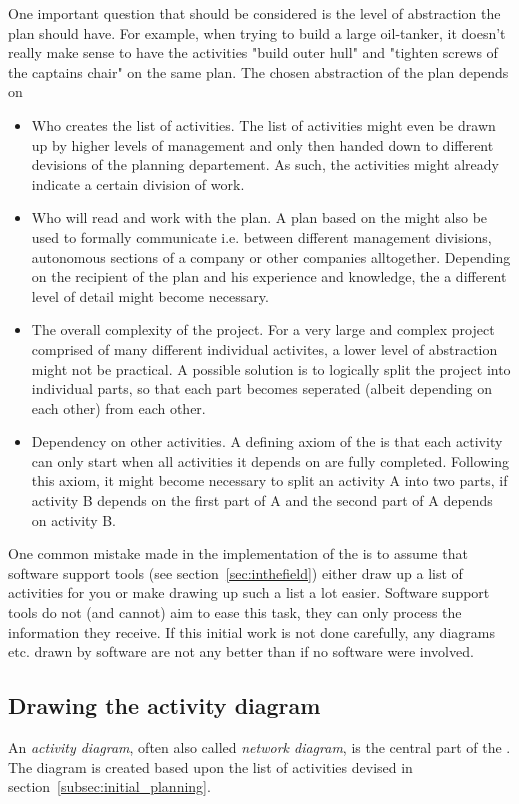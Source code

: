 One important question that should be considered is the level of abstraction the plan should have.
For example, when trying to build a large oil-tanker, it doesn't really make sense to have the
activities "build outer hull" and "tighten screws of the captains chair" on the same plan. The
chosen abstraction of the plan depends on
\begin{itemize}
  \item Who creates the list of activities. The list of activities might even be drawn up by higher
    levels of management and only then handed down to different devisions of the planning
    departement. As such, the activities might already indicate a certain division of work. 
  \item Who will read and work with the plan. A plan based on the \cpm{} might also be used to 
    formally communicate i.e. between different management divisions, autonomous sections of a 
    company or other companies alltogether. Depending on the recipient of the plan and his
    experience and knowledge, the a different level of detail might become necessary.
  \item The overall complexity of the project. For a very large and complex project comprised of
    many different individual activites, a lower level of abstraction might not be practical. A
    possible solution is to logically split the project into individual parts, so that each part
    becomes seperated (albeit depending on each other) from each other. 
  \item Dependency on other activities. A defining axiom of the \cpm{} is that each activity can
    only start when all activities it depends on are fully completed\cite[p. 37]{obrien}. Following
    this axiom, it might become necessary to split an activity A into two parts, if activity B
    depends on the first part of A and the second part of A depends on activity B.
\end{itemize}

One common mistake made in the implementation of the \cpm{} is to assume that software support tools
(see section~\ref{sec:inthefield}) either draw up a list of activities for you or make drawing up
such a list a lot easier. Software support tools do not (and cannot) aim to ease this task, they can
only process the information they receive. If this initial work is not done carefully, any diagrams
etc. drawn by software are not any better than if no software were involved\cite[p. 39]{obrien}.

\subsection{Drawing the activity diagram}
An \emph{activity diagram}, often also called \emph{network diagram}, is the central part of the
\cpm{}. The diagram is created based upon the list of activities devised in
section~\ref{subsec:initial_planning}. 

